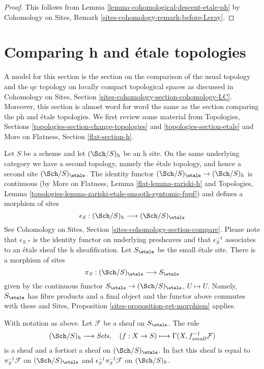 \begin{proof}
This follows from Lemma \ref{lemma-cohomological-descent-etale-ph}
by Cohomology on Sites, Remark \ref{sites-cohomology-remark-before-Leray}.
\end{proof}












\section{Comparing h and \'etale topologies}
\label{section-h-etale}

\noindent
A model for this section is the section on the comparison of the
usual topology and the qc topology on locally compact topological
spaces as discussed in
Cohomology on Sites, Section \ref{sites-cohomology-section-cohomology-LC}.
Moreover, this section is almost word for word the same as the
section comparing the ph and \'etale topologies.
We first review some material from
Topologies, Sections
\ref{topologies-section-change-topologies} and
\ref{topologies-section-etale} and
More on Flatness, Section \ref{flat-section-h}.

\medskip\noindent
Let $S$ be a scheme and let $(\Sch/S)_h$ be an h site.
On the same underlying category we have a second topology,
namely the \'etale topology, and hence a second site
$(\Sch/S)_\etale$. The identity functor
$(\Sch/S)_\etale \to (\Sch/S)_h$ is continuous
(by More on Flatness, Lemma \ref{flat-lemma-zariski-h}
and Topologies, Lemma
\ref{topologies-lemma-zariski-etale-smooth-syntomic-fppf})
and defines a morphism of sites
$$
\epsilon_S : (\Sch/S)_h \longrightarrow (\Sch/S)_\etale
$$
See Cohomology on Sites, Section \ref{sites-cohomology-section-compare}.
Please note that $\epsilon_{S, *}$ is the identity functor on underlying
presheaves and that $\epsilon_S^{-1}$ associates to an \'etale sheaf the
h sheafification. Let $S_\etale$ be the small \'etale site.
There is a morphism of sites
$$
\pi_S : (\Sch/S)_\etale \longrightarrow S_\etale
$$
given by the continuous functor
$S_\etale \to (\Sch/S)_\etale$, $U \mapsto U$.
Namely, $S_\etale$ has fibre products and a final object and the
functor above commutes with these and
Sites, Proposition \ref{sites-proposition-get-morphism} applies.

\begin{lemma}
\label{lemma-describe-pullback-pi-h}
With notation as above.
Let $\mathcal{F}$ be a sheaf on $S_\etale$. The rule
$$
(\Sch/S)_h \longrightarrow \textit{Sets},\quad
(f : X \to S) \longmapsto \Gamma(X, f_{small}^{-1}\mathcal{F})
$$
is a sheaf and a fortiori a sheaf on $(\Sch/S)_\etale$.
In fact this sheaf is equal to
$\pi_S^{-1}\mathcal{F}$ on $(\Sch/S)_\etale$ and
$\epsilon_S^{-1}\pi_S^{-1}\mathcal{F}$ on $(\Sch/S)_h$.
\end{lemma}

